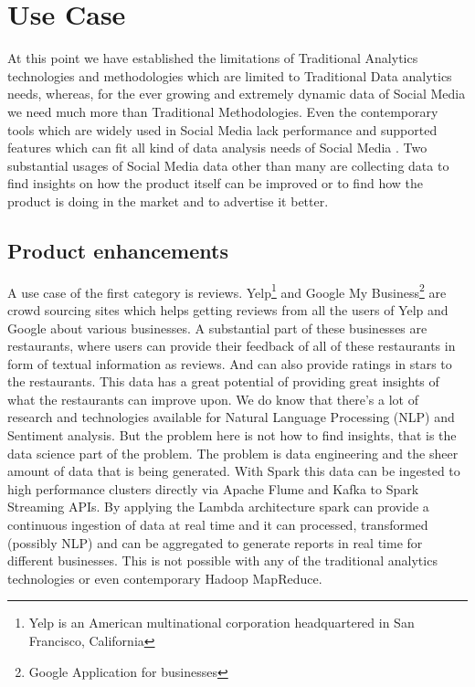 \documentclass[sigconf]{acmart}
\begin{document}
\section{Use Case}
At this point we have established the limitations of Traditional Analytics technologies and methodologies which are limited to Traditional Data analytics needs, whereas, for the ever growing and extremely dynamic data of Social Media we need much more than Traditional Methodologies. Even the contemporary tools which are widely used in Social Media lack performance and supported features which can fit all kind of data analysis needs of Social Media  \cite{krishnan}. Two substantial usages of Social Media data other than many are collecting data to find insights on how the product itself can be improved or to find how the product is doing in the market and to advertise it better.
\subsection{Product enhancements}
A use case of the first category is reviews. Yelp\footnote{Yelp is an American multinational corporation headquartered in San Francisco, California} and Google My Business\footnote{Google Application for businesses} are crowd sourcing sites which helps getting reviews from all the users of Yelp and Google about various businesses. A substantial part of these businesses are restaurants, where users can provide their feedback of all of these restaurants in form of textual information as reviews. And can also provide ratings in stars to the restaurants. This data has a great potential of providing great insights of what the restaurants can improve upon. We do know that there's a lot of research and technologies available for Natural Language Processing (NLP) and Sentiment analysis. But the problem here is not how to find insights, that is the data science part of the problem. The problem is data engineering and the sheer amount of data that is being generated. With Spark this data can be ingested to high performance clusters directly via Apache Flume and Kafka to Spark Streaming APIs. By applying the Lambda architecture  \cite{lambdaspark} spark can provide a continuous ingestion of data at real time and it can processed, transformed (possibly NLP) and can be aggregated to generate reports in real time for different businesses. This is not possible with any of the traditional analytics technologies or even contemporary Hadoop MapReduce.
\end{document}
